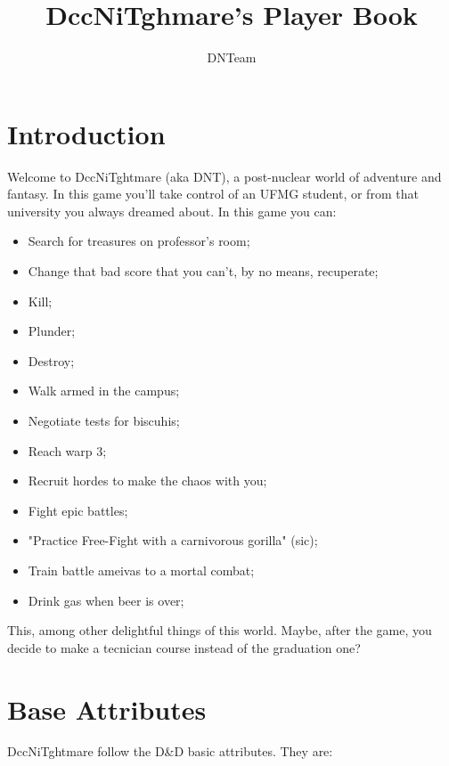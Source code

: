 \documentclass[ letterpaper,12pt]{article}
\begin{document}
\title{\textbf{DccNiTghmare's Player Book}}

\author{
DNTeam
}

\maketitle
{}

\newpage

\tableofcontents

\newpage
\section{Introduction}

Welcome to DccNiTghtmare (aka DNT), a post-nuclear world of adventure and fantasy.
In this game you'll take control of an UFMG student, or from that university
you always dreamed about. In this game you can:

\begin{itemize}
\item{Search for treasures on professor's room;}
\item{Change that bad score that you can't, by no means, recuperate;}
\item{Kill;}
\item{Plunder;}
\item{Destroy;}
\item{Walk armed in the campus;}
\item{Negotiate tests for biscuhis;}
\item{Reach warp 3;}
\item{Recruit hordes to make the chaos with you;}
\item{Fight epic battles;}
\item{"Practice Free-Fight with a carnivorous gorilla" (sic);}
\item{Train battle ameivas to a mortal combat;}
\item{Drink gas when beer is over;}
\end{itemize}

This, among other delightful things of this world. Maybe, after the game, you
decide to make a tecnician course instead of the graduation one?

\section{Base Attributes}
DccNiTghtmare follow the D\&D basic attributes. They are:
\end{document}
